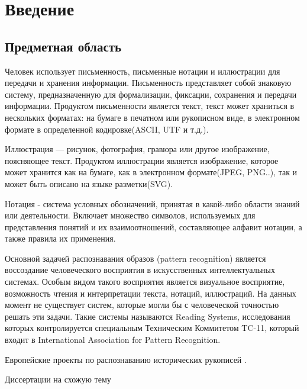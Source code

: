 \chapter*{Введение}                         %


\section*{Предметная область}

Человек использует письменность, письменные нотации и иллюстрации для передачи и хранения информации. Письменность представляет собой знаковую систему, предназначенную для формализации, фиксации, сохранения и передачи информации. Продуктом письменности является текст, текст может храниться в нескольких форматах: на бумаге в печатном или рукописном виде, в электронном формате в определенной кодировке(ASCII, UTF\cite{unicode1991unicode} и т.д.).

Иллюстрация — рисунок, фотография, гравюра или другое изображение, поясняющее текст. Продуктом иллюстрации является изображение, которое может хранится как на бумаге, как в электронном формате(JPEG, PNG..), так и может быть описано на языке разметки(SVG).

Нотация - система условных обозначений, принятая в какой-либо области знаний или деятельности. Включает множество символов, используемых для представления понятий и их взаимоотношений, составляющее алфавит нотации, а также правила их применения.

Основной задачей распознавания образов (pattern recognition) является воссоздание человеческого восприятия в искусственных интеллектуальных системах. Особым видом такого восприятия является визуальное восприятие, возможность чтения и интерпретации текста, нотаций, иллюстраций. На данных момент не существует систем, которые могли бы с человеческой точностью решать эти задачи. Такие системы называются Reading Systems, исследования которых контролируется специальным Техническим Коммитетом TC-11, который входит в International Association for Pattern Recognition.

Европейские проекты по распознаванию исторических рукописей \cite{vidal2014d5, romero2012multimodal}.

Диссертации на схожую тему \cite{guillevic1995unconstrained, vinciarelli2003offline, tay2002offline, fischer2012handwriting, romero2012multimodal}

